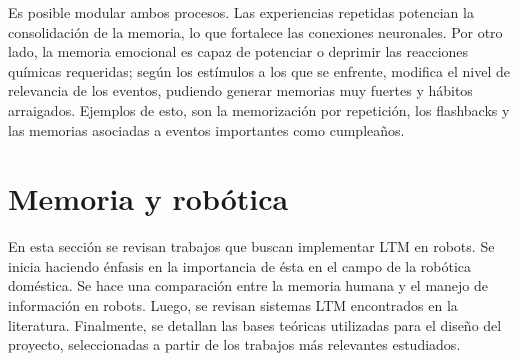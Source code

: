 Es posible modular ambos procesos. Las experiencias repetidas potencian la consolidación de la memoria, lo que fortalece las conexiones neuronales. Por otro lado, la memoria emocional es capaz de potenciar o deprimir las reacciones químicas requeridas; según los estímulos a los que se enfrente, modifica el nivel de relevancia de los eventos, pudiendo generar memorias muy fuertes y hábitos arraigados. Ejemplos de esto, son la memorización por repetición, los flashbacks y las memorias asociadas a eventos importantes como cumpleaños.









\section{Memoria y robótica}\label{sec:robotic_memory}

En esta sección se revisan trabajos que buscan implementar LTM en robots. Se inicia haciendo énfasis en la importancia de ésta en el campo de la robótica doméstica. Se hace una comparación entre la memoria humana y el manejo de información en robots. Luego, se revisan sistemas LTM encontrados en la literatura. Finalmente, se detallan las bases teóricas utilizadas para el diseño del proyecto, seleccionadas a partir de los trabajos más relevantes estudiados.


